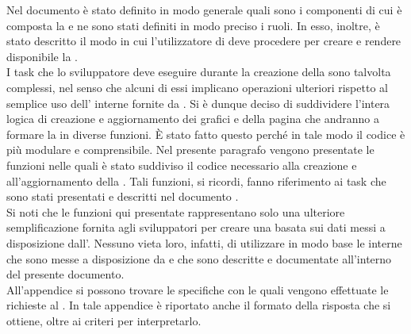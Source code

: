     Nel documento  è stato definito in modo generale quali sono i componenti di cui è composta la  e ne sono stati definiti in modo preciso i ruoli. In esso, inoltre, è stato descritto il modo in cui l'utilizzatore di  deve procedere per creare e rendere disponibile la .\\
    I task che lo sviluppatore deve eseguire durante la creazione della  sono talvolta complessi, nel senso che alcuni di essi implicano operazioni ulteriori rispetto al semplice uso dell'  interne fornite da . Si è dunque deciso di suddividere l'intera logica di creazione e aggiornamento dei grafici e della pagina che andranno a formare la  in diverse funzioni. È stato fatto questo perché in tale modo il codice è più modulare e comprensibile.
        Nel presente paragrafo vengono presentate le funzioni nelle quali è stato suddiviso il codice necessario alla creazione e all'aggiornamento della . Tali funzioni, si ricordi, fanno riferimento ai task che sono stati presentati e descritti nel documento .\\
        Si noti che le funzioni qui presentate rappresentano solo una ulteriore semplificazione fornita agli sviluppatori per creare una  basata sui dati messi a disposizione dall'. Nessuno vieta loro, infatti, di utilizzare in modo base le  interne che sono messe a disposizione da  e che sono descritte e documentate all'interno del presente documento.\\
        All'appendice  si possono trovare le specifiche con le quali vengono effettuate le richieste al  . In tale appendice è riportato anche il formato della risposta che si ottiene, oltre ai criteri per interpretarlo.

